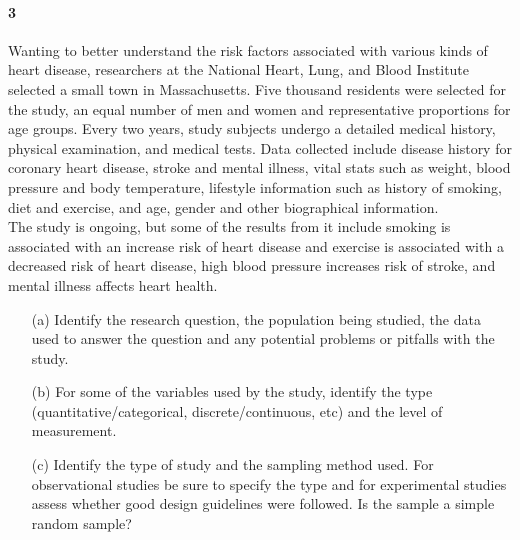 \documentclass{article}
\begin{document}
\begin{flushleft}
\paragraph{3} Wanting to better understand the risk factors associated with various kinds of heart disease, researchers at the National Heart, Lung, and Blood Institute selected a small town in Massachusetts. Five thousand residents were selected for the study, an equal number of men and women and representative proportions for age groups. Every two years, study subjects undergo a detailed medical history, physical examination, and medical tests. Data collected include disease history for coronary heart disease, stroke and mental illness, vital stats such as weight, blood pressure and body temperature, lifestyle information such as history of smoking, diet and exercise, and age, gender and other biographical information.\\
\medskip
The study is ongoing, but some of the results from it include smoking is associated with an increase risk of heart disease and exercise is associated with a decreased risk of heart disease, high blood pressure increases risk of stroke, and mental illness affects heart health.

\begin{itemize}
\item [(a)] Identify the research question, the population being studied, the data used to answer the question and any potential problems or pitfalls with the study.
\vspace{1.5in}
\item[(b)] For some of the variables used by the study, identify the type (quantitative/categorical, discrete/continuous, etc) and the level of measurement.
\vspace{1.5in}
\item[(c)] Identify the type of study and the sampling method used. For observational studies be sure to specify the type and for experimental studies assess whether good design guidelines were followed. Is the sample a simple random sample?
\end{itemize}
\end{flushleft}
\end{document}
